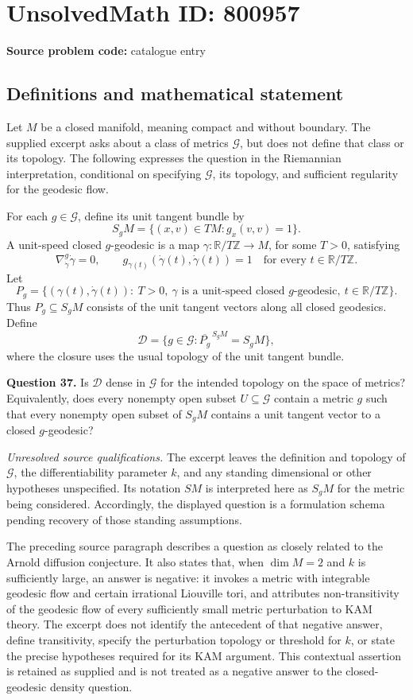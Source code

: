 \documentclass[11pt]{article}
\newcommand{\Z}{\mathbb{Z}}
\newcommand{\R}{\mathbb{R}}
\begin{document}
\section*{UnsolvedMath ID: 800957}
\textbf{Source problem code:} catalogue entry
\subsection{Definitions and mathematical statement}
Let \(M\) be a closed manifold, meaning compact and without boundary. The supplied excerpt asks about a class of metrics \(\mathcal G\), but does not define that class or its topology. The following expresses the question in the Riemannian interpretation, conditional on specifying \(\mathcal G\), its topology, and sufficient regularity for the geodesic flow.

For each \(g\in\mathcal G\), define its unit tangent bundle by
\[
S_gM=\{(x,v)\in TM:g_x(v,v)=1\}.
\]
A unit-speed closed \(g\)-geodesic is a map \(\gamma:\R/T\Z\to M\), for some \(T>0\), satisfying
\[
\nabla^g_{\dot\gamma}\dot\gamma=0,
\qquad g_{\gamma(t)}(\dot\gamma(t),\dot\gamma(t))=1
\quad\text{for every }t\in\R/T\Z.
\]
Let
\[
P_g=\bigl\{(\gamma(t),\dot\gamma(t)):\ T>0,\ \gamma\text{ is a unit-speed closed }g\text{-geodesic},\ t\in\R/T\Z\bigr\}.
\]
Thus \(P_g\subseteq S_gM\) consists of the unit tangent vectors along all closed geodesics. Define
\[
\mathcal D=\{g\in\mathcal G:\overline{P_g}^{\,S_gM}=S_gM\},
\]
where the closure uses the usual topology of the unit tangent bundle.

\textbf{Question 37.} Is \(\mathcal D\) dense in \(\mathcal G\) for the intended topology on the space of metrics? Equivalently, does every nonempty open subset \(U\subseteq\mathcal G\) contain a metric \(g\) such that every nonempty open subset of \(S_gM\) contains a unit tangent vector to a closed \(g\)-geodesic?

\textit{Unresolved source qualifications.} The excerpt leaves the definition and topology of \(\mathcal G\), the differentiability parameter \(k\), and any standing dimensional or other hypotheses unspecified. Its notation \(SM\) is interpreted here as \(S_gM\) for the metric being considered. Accordingly, the displayed question is a formulation schema pending recovery of those standing assumptions.

The preceding source paragraph describes a question as closely related to the Arnold diffusion conjecture. It also states that, when \(\dim M=2\) and \(k\) is sufficiently large, an answer is negative: it invokes a metric with integrable geodesic flow and certain irrational Liouville tori, and attributes non-transitivity of the geodesic flow of every sufficiently small metric perturbation to KAM theory. The excerpt does not identify the antecedent of that negative answer, define transitivity, specify the perturbation topology or threshold for \(k\), or state the precise hypotheses required for its KAM argument. This contextual assertion is retained as supplied and is not treated as a negative answer to the closed-geodesic density question.
\end{document}
